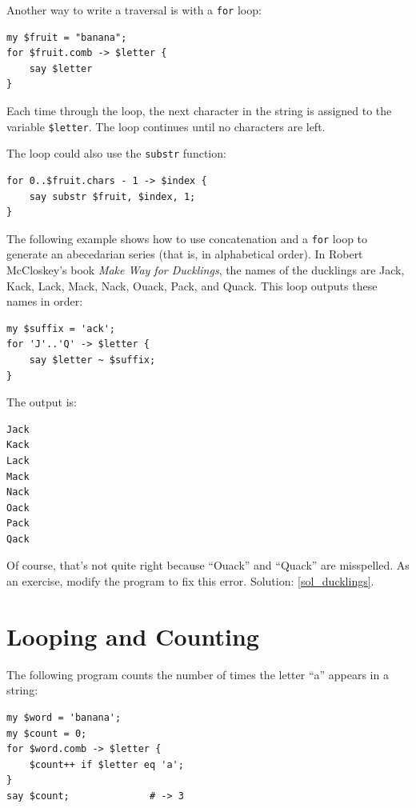 Another way to write a traversal is with a {\tt for} loop:

\begin{verbatim}
my $fruit = "banana";
for $fruit.comb -> $letter {
    say $letter
}
\end{verbatim}
%

Each time through the loop, the next character in the string 
is assigned to the variable {\tt \$letter}.  The loop 
continues until no characters are left.

The loop could also use the {\tt substr} function:

\begin{verbatim}
for 0..$fruit.chars - 1 -> $index {
    say substr $fruit, $index, 1;
}
\end{verbatim}
%


The following example shows how to use concatenation and a 
{\tt for} loop to generate an abecedarian series (that is, in
alphabetical order).  In Robert McCloskey's book {\em Make
Way for Ducklings}, the names of the ducklings are Jack, Kack, Lack,
Mack, Nack, Ouack, Pack, and Quack.  This loop outputs these names in
order:

\begin{verbatim}
my $suffix = 'ack';
for 'J'..'Q' -> $letter {
    say $letter ~ $suffix;
}
\end{verbatim}
%
The output is:

\begin{verbatim}
Jack
Kack
Lack
Mack
Nack
Oack
Pack
Qack
\end{verbatim}
%
Of course, that's not quite right because ``Ouack'' and 
``Quack'' are misspelled.  As an exercise, modify the program 
to fix this error. Solution: \ref{sol_ducklings}.


\section{Looping and Counting}
\label{counter}

The following program counts the number of times the 
letter ``a'' appears in a string:

\begin{verbatim}
my $word = 'banana';
my $count = 0;
for $word.comb -> $letter {
    $count++ if $letter eq 'a';
}
say $count;              # -> 3
\end{verbatim}
%

